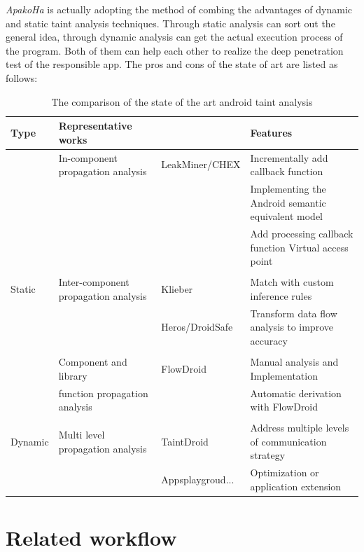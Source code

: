\documentclass{article}
\begin{document}
\emph{ApakoHa} is actually adopting the method of combing the advantages of dynamic and static taint analysis techniques. Through static analysis can sort out the general idea, through dynamic analysis can get the actual execution process of the program. Both of them can help each other to realize the deep penetration test of the responsible app. The pros and cons of the state of art are listed as follows:

\begin{table}
  \caption{The comparison of the state of the art android taint analysis}
   \centering
   \begin{tabular}{llll}
     \toprule
     Type     & Representative works &     & Features \\
     \midrule
           & In-component propagation analysis &LeakMiner/CHEX  & Incrementally add callback function \\
            &                                   &                 &  Implementing the Android semantic equivalent model     \\
            &                                   &                 &  Add processing callback function Virtual access point    \\
      
           &  & &     \\
      Static & Inter-component propagation analysis &Klieber  &Match with custom inference rules    \\
           &  &Heros/DroidSafe & Transform data flow analysis to improve accuracy     \\
           &  & &     \\
           &  Component and library & FlowDroid& Manual analysis and Implementation \\
           & function propagation analysis & &    Automatic derivation with FlowDroid   \\
           &  & &     \\
     Dynamic & Multi level propagation analysis&TaintDroid & Address multiple levels of communication strategy      \\
           &   & Appsplaygroud...   & Optimization or application extension  \\
     \bottomrule
   \end{tabular}
   \label{tab:table1}
 \end{table}


\section{Related workflow}
\end{document}
